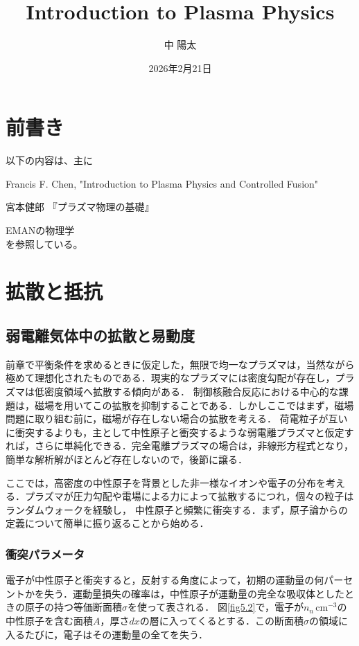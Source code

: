 \documentclass{ltjsarticle}
\title{Introduction to Plasma Physics}
\author{中 陽太}
\date{2026年2月21日}
\numberwithin{equation}{section} %
\begin{document}
\maketitle

\tableofcontents

\section*{前書き}
 以下の内容は、主に

\cite{a} Francis F. Chen, "Introduction to Plasma Physics and Controlled Fusion"\par
\cite{b} 宮本健郎 『プラズマ物理の基礎』\par
\cite{c} EMANの物理学\\
を参照している。



\section{拡散と抵抗} \label{section5}
\subsection{弱電離気体中の拡散と易動度} \label{section5.1}
前章で平衡条件を求めるときに仮定した，無限で均一なプラズマは，当然ながら極めて理想化されたものである．現実的なプラズマには密度勾配が存在し，プラズマは低密度領域へ拡散する傾向がある．
制御核融合反応における中心的な課題は，磁場を用いてこの拡散を抑制することである．しかしここではまず，磁場問題に取り組む前に，磁場が存在しない場合の拡散を考える．
荷電粒子が互いに衝突するよりも，主として中性原子と衝突するような弱電離プラズマと仮定すれば，さらに単純化できる．完全電離プラズマの場合は，非線形方程式となり，簡単な解析解がほとんど存在しないので，後節に譲る．

ここでは，高密度の中性原子を背景とした非一様なイオンや電子の分布を考える．プラズマが圧力勾配や電場による力によって拡散するにつれ，個々の粒子はランダムウォークを経験し，
中性原子と頻繁に衝突する．まず，原子論からの定義について簡単に振り返ることから始める．

\subsubsection{衝突パラメータ} \label{section5.1.1}
電子が中性原子と衝突すると，反射する角度によって，初期の運動量の何パーセントかを失う．運動量損失の確率は，中性原子が運動量の完全な吸収体としたときの原子の持つ等価断面積$\sigma$を使って表される．
図\ref{fig5.2}で，電子が$n_n\,\mathrm{cm^{-3}}$の中性原子を含む面積$A$，厚さ$dx$の層に入ってくるとする．この断面積$\sigma$の領域に入るたびに，電子はその運動量の全てを失う．
\end{document}
